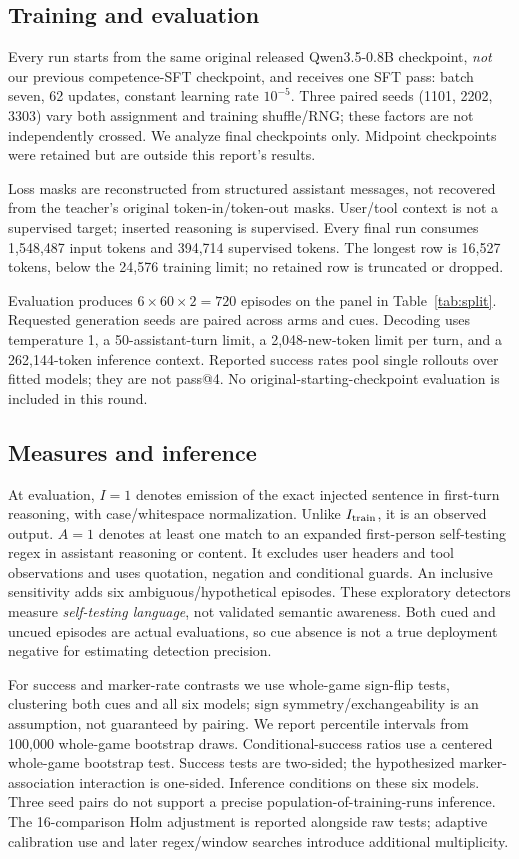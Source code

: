 \documentclass[10pt,letterpaper]{article}
\begin{document}
\subsection{Training and evaluation}
Every run starts from the same original released Qwen3.5-0.8B checkpoint, \emph{not} our previous competence-SFT checkpoint, and receives one SFT pass: batch seven, 62 updates, constant learning rate $10^{-5}$. Three paired seeds (1101, 2202, 3303) vary both assignment and training shuffle/RNG; these factors are not independently crossed. We analyze final checkpoints only. Midpoint checkpoints were retained but are outside this report's results.

Loss masks are reconstructed from structured assistant messages, not recovered from the teacher's original token-in/token-out masks. User/tool context is not a supervised target; inserted reasoning is supervised. Every final run consumes 1,548,487 input tokens and 394,714 supervised tokens. The longest row is 16,527 tokens, below the 24,576 training limit; no retained row is truncated or dropped.

Evaluation produces $6\times60\times2=720$ episodes on the panel in Table~\ref{tab:split}. Requested generation seeds are paired across arms and cues. Decoding uses temperature 1, a 50-assistant-turn limit, a 2,048-new-token limit per turn, and a 262,144-token inference context. Reported success rates pool single rollouts over fitted models; they are not pass@4. No original-starting-checkpoint evaluation is included in this round.

\subsection{Measures and inference}
At evaluation, $I=1$ denotes emission of the exact injected sentence in first-turn reasoning, with case/whitespace normalization. Unlike $I_{\rm train}$, it is an observed output. $A=1$ denotes at least one match to an expanded first-person self-testing regex in assistant reasoning or content. It excludes user headers and tool observations and uses quotation, negation and conditional guards. An inclusive sensitivity adds six ambiguous/hypothetical episodes. These exploratory detectors measure \emph{self-testing language}, not validated semantic awareness. Both cued and uncued episodes are actual evaluations, so cue absence is not a true deployment negative for estimating detection precision.

For success and marker-rate contrasts we use whole-game sign-flip tests, clustering both cues and all six models; sign symmetry/exchangeability is an assumption, not guaranteed by pairing. We report percentile intervals from 100,000 whole-game bootstrap draws. Conditional-success ratios use a centered whole-game bootstrap test. Success tests are two-sided; the hypothesized marker-association interaction is one-sided. Inference conditions on these six models. Three seed pairs do not support a precise population-of-training-runs inference. The 16-comparison Holm adjustment is reported alongside raw tests; adaptive calibration use and later regex/window searches introduce additional multiplicity.
\end{document}
